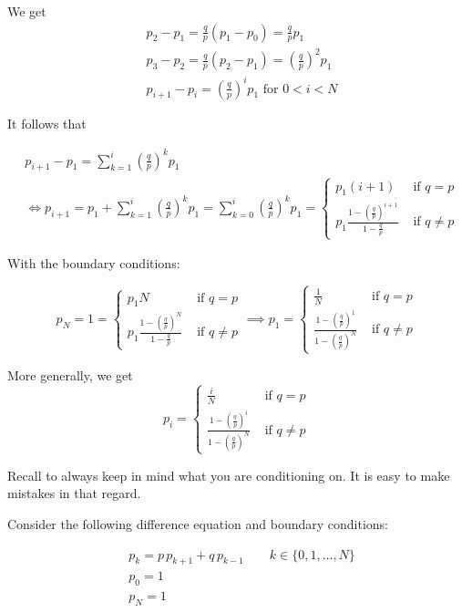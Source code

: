 \documentclass{article}
\theoremstyle{definition}
\begin{document}
We get
\begin{align*}
&p_2 - p_1 = \tfrac{q}{p} \left( p_1 - p_{0} \right) =  \tfrac{q}{p} p_1 \\
&p_3 - p_2 =  \tfrac{q}{p} \left(p_2 - p_1 \right) = \left( \tfrac{q}{p} \right)^2 p_1 \\
&p_{i+1}-p_i = \left( \tfrac{q}{p} \right)^i p_1 \text{ for } 0 < i < N
\end{align*}

It follows that 

\begin{align*}
&p_{i+1} - p_1 = \sum_{k=1}^i \left( \tfrac{q}{p} \right)^k p_1 \\
&\iff p_{i+1} = p_1 + \sum_{k=1}^i \left( \tfrac{q}{p} \right)^k p_1 = \sum_{k=0}^i \left( \tfrac{q}{p} \right)^k p_1 = \begin{cases} p_1 (i+1) & \text{ if } q = p \\
p_1 \frac{1-\left( \tfrac{q}{p} \right)^{i+1}}{1-\tfrac{q}{p}} & \text{ if } q \ne p\end{cases}
\end{align*}

With the boundary conditions:

$$
p_N = 1 = \begin{cases} p_1 N & \text{ if } q = p \\
p_1 \frac{1-\left( \tfrac{q}{p} \right)^{N}}{1-\tfrac{q}{p}} & \text{ if } q \ne p\end{cases} \implies p_1 = \begin{cases} \frac{1}{N} & \text{ if } q = p \\
 \frac{1-\left( \tfrac{q}{p} \right)^{1}}{1-\left( \tfrac{q}{p} \right)^N} & \text{ if } q \ne p\end{cases}
$$

More generally, we get 
$$
 p_i = \begin{cases} \frac{i}{N} & \text{ if } q = p \\
 \frac{1-\left( \tfrac{q}{p} \right)^{i}}{1-\left( \tfrac{q}{p} \right)^N} & \text{ if } q \ne p\end{cases}
$$

Recall to always keep in mind what you are conditioning on. It is easy to make mistakes in that regard. 

Consider the following difference equation and boundary conditions:

\begin{align*}
&p_k = p \, p_{k+1}  + q \, p_{k-1} \qquad k \in \{0, 1, \ldots, N\}\\
&p_0 = 1 \\
&p_N = 1\\
\end{align*}
\end{document}
